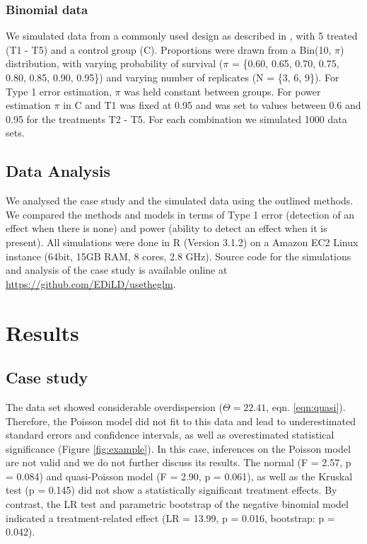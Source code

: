\documentclass[twocolumn, natbib]{svjour3}
\begin{document}
\subsubsection{Binomial data}
We simulated data from a commonly used design as described in \citet{weber_short-term_1989}, with 5 treated (T1 - T5) and a control group (C). 
Proportions were drawn from a Bin(10, $\pi$) distribution, with varying probability of survival ($\pi$ = \{0.60, 0.65, 0.70, 0.75, 0.80, 0.85, 0.90, 0.95\}) and varying number of replicates (N = \{3, 6, 9\}).
For Type 1 error estimation, $\pi$ was held constant between groups.
For power estimation $\pi$ in C and T1 was fixed at 0.95 and was set to values between 0.6 and 0.95 for the treatments T2 - T5. 
For each combination we simulated 1000 data sets. 

\subsection{Data Analysis}
We analysed the case study and the simulated data using the outlined methods.
We compared the methods and models in terms of Type 1 error (detection of an effect when there is none) and power (ability to detect an effect when it is present).
All simulations were done in R (Version 3.1.2) \citep{r_core_team_r:_2014} on a Amazon EC2 Linux instance (64bit, 15GB RAM, 8 cores, 2.8 GHz).
Source code for the simulations and analysis of the case study is available online at \url{https://github.com/EDiLD/usetheglm}.



\section{Results}
\label{sec:results}
\subsection{Case study}
The data set showed considerable overdispersion ($\Theta = 22.41$, eqn. \ref{eqn:quasi}).
Therefore, the Poisson model did not fit to this data and lead to underestimated standard errors and confidence intervals, as well as overestimated statistical significance (Figure \ref{fig:example}).
In this case, inferences on the Poisson model are not valid and we do not further discuss its results.
The normal (F = 2.57, p = 0.084) and quasi-Poisson model (F = 2.90, p = 0.061), as well as the Kruskal test (p =  0.145) did not show a statistically significant treatment effects.
By contrast, the LR test and parametric bootstrap of the negative binomial model indicated a treatment-related effect (LR = 13.99, p = 0.016, bootstrap: p = 0.042).
\end{document}
